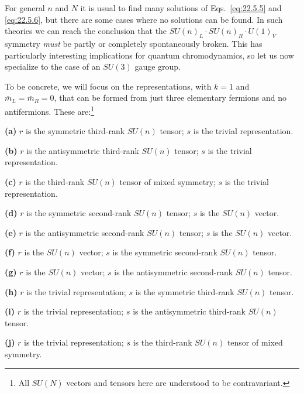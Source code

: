 For general $n$ and $N$ it is usual to find many solutions of
Eqs.~\eqref{eq:22.5.5} and \eqref{eq:22.5.6}, but there are some cases
where no solutions can be found. In such theories we can reach the
conclusion that the $SU(n)_L\cdot SU(n)_R\cdot U(1)_V$ symmetry \emph{must}
be partly or completely spontaneously broken. This has particularly
interesting implications for quantum chromodynamics, so let us now
specialize to the case of an $SU(3)$ gauge group.

To be concrete, we will focus on the representations, with $k=1$ and
$\bar m_L=\bar m_R=0$, that can be formed from just three elementary
fermions and no antifermions. These are:\footnote{All $SU(N)$ vectors and
tensors here are understood to be contravariant.}

\medskip
\noindent\textbf{(a)} $r$ is the symmetric third-rank $SU(n)$ tensor; $s$
is the trivial representation.

\noindent\textbf{(b)} $r$ is the antisymmetric third-rank $SU(n)$ tensor;
$s$ is the trivial representation.

\noindent\textbf{(c)} $r$ is the third-rank $SU(n)$ tensor of mixed
symmetry; $s$ is the trivial representation.

\noindent\textbf{(d)} $r$ is the symmetric second-rank $SU(n)$ tensor; $s$
is the $SU(n)$ vector.

\noindent\textbf{(e)} $r$ is the antisymmetric second-rank $SU(n)$ tensor;
$s$ is the $SU(n)$ vector.

\noindent\textbf{(f)} $r$ is the $SU(n)$ vector; $s$ is the symmetric
second-rank $SU(n)$ tensor.

\noindent\textbf{(g)} $r$ is the $SU(n)$ vector; $s$ is the antisymmetric
second-rank $SU(n)$ tensor.

\noindent\textbf{(h)} $r$ is the trivial representation; $s$ is the
symmetric third-rank $SU(n)$ tensor.

\noindent\textbf{(i)} $r$ is the trivial representation; $s$ is the
antisymmetric third-rank $SU(n)$ tensor.

\noindent\textbf{(j)} $r$ is the trivial representation; $s$ is the
third-rank $SU(n)$ tensor of mixed symmetry.
\medskip

